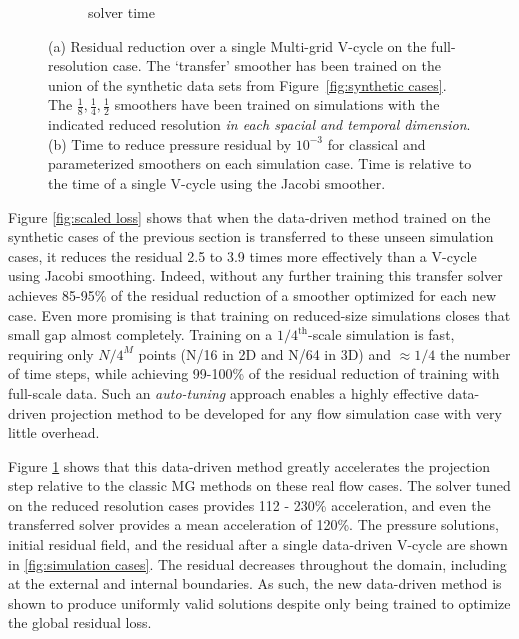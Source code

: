 \documentclass[review]{elsarticle}
\begin{document}
\begin{figure}
\begin{subfigure}[b]{0.47\textwidth}
        \caption{solver time}
        \label{fig:simulation time}
    \end{subfigure}
        \caption{(a) Residual reduction over a single Multi-grid V-cycle on the full-resolution case. The `transfer' smoother has been trained on the union of the synthetic data sets from Figure~\ref{fig:synthetic cases}. The $\frac 18, \frac 14, \frac 12$ smoothers have been trained on simulations with the indicated reduced resolution \textit{in each spacial and temporal dimension}. (b) Time to reduce pressure residual by $10^{-3}$ for classical and parameterized smoothers on each simulation case. Time is relative to the time of a single V-cycle using the Jacobi smoother.}
        \label{fig:tuned simulation}
\end{figure}

Figure \ref{fig:scaled loss} shows that when the data-driven method trained on the synthetic cases of the previous section is transferred to these unseen simulation cases, it reduces the residual 2.5 to 3.9 times more effectively than a V-cycle using Jacobi smoothing. Indeed, without any further training this transfer solver achieves 85-95\% of the residual reduction of a smoother optimized for each new case. Even more promising is that training on reduced-size simulations closes that small gap almost completely. Training on a $1/4^\text{th}$-scale simulation is fast, requiring only $N/4^M$ points (N/16 in 2D and N/64 in 3D) and $\approx 1/4$ the number of time steps, while achieving 99-100\% of the residual reduction of training with full-scale data. Such an \textit{auto-tuning} approach enables a highly effective data-driven projection method to be developed for any flow simulation case with very little overhead.

Figure \ref{fig:simulation time} shows that this data-driven method greatly accelerates the projection step relative to the classic MG methods on these real flow cases. The solver tuned on the reduced resolution cases provides 112 - 230\% acceleration, and even the transferred solver provides a mean acceleration of 120\%. The pressure solutions, initial residual field, and the residual after a single data-driven V-cycle are shown in \ref{fig:simulation cases}. The residual decreases throughout the domain, including at the external and internal boundaries. As such, the new data-driven method is shown to produce uniformly valid solutions despite only being trained to optimize the global residual loss.
\end{document}
